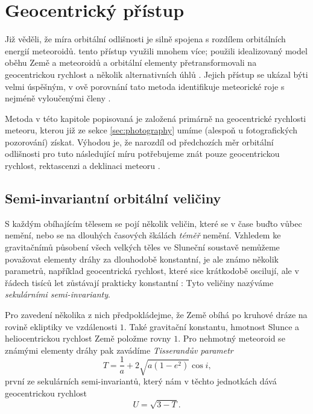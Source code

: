 \chapter{Geocentrický přístup}%
Již \citeauthor{dsh} věděli, že míra orbitální odlišnosti je silně spojena s rozdílem orbitálních energií meteoroidů. \citeauthor{newapproach} tento přístup využili mnohem více; použili idealizovaný model oběhu Země a meteoroidů a orbitální elementy přetransformovali na geocentrickou rychlost a několik alternativních úhlů \cite{newapproach}. Jejich přístup se ukázal býti velmi úspěšným, v \citeauthor{galligan}ově porovnání tato metoda identifikuje meteorické roje s nejméně vyloučenými členy \cite{galligan}.

Metoda v této kapitole popisovaná je založená primárně na geocentrické rychlosti meteoru, kterou již ze sekce \ref{sec:photography} umíme (alespoň u fotografických pozorování) získat. Výhodou je, že narozdíl od předchozích měr orbitální odlišnosti pro tuto následující míru potřebujeme znát pouze geocentrickou rychlost, rektascenzi a deklinaci meteoru \cite{newapproach}. 

\section{Semi-invariantní orbitální veličiny}%
S každým obíhajícím tělesem se pojí několik veličin, které se v čase buďto vůbec nemění, nebo se na dlouhých časových škálách \textit{téměř} nemění. Vzhledem ke gravitačnímů působení všech velkých těles ve Sluneční soustavě nemůžeme považovat elementy dráhy za dlouhodobě konstantní, je ale známo několik parametrů, například geocentrická rychlost, které sice krátkodobě oscilují, ale v řádech tisíců let zůstávají prakticky konstantní \cite{newapproach}: Tyto veličiny nazýváme \textit{sekulárními semi-invarianty}.

\medskip

Pro zavedení několika z nich předpokládejme, že Země obíhá po kruhové dráze na rovině ekliptiky ve vzdálenosti $1$. Také gravitační konstantu, hmotnost Slunce a heliocentrickou rychlost Země položme rovny $1$. Pro nehmotný meteoroid se známými elementy dráhy pak zavádíme \textit{Tisserandův parametr} \cite{newapproach}
\begin{equation}
    T=\frac{1}{a}+2\sqrt{a(1-e^2)}\cos{i} \text{,}
\end{equation}
první ze sekulárních semi-invariantů, který nám v těchto jednotkách dává geocentrickou rychlost \cite{newapproach}
\begin{equation}
    U=\sqrt{3-T}\text{.}
\end{equation}

